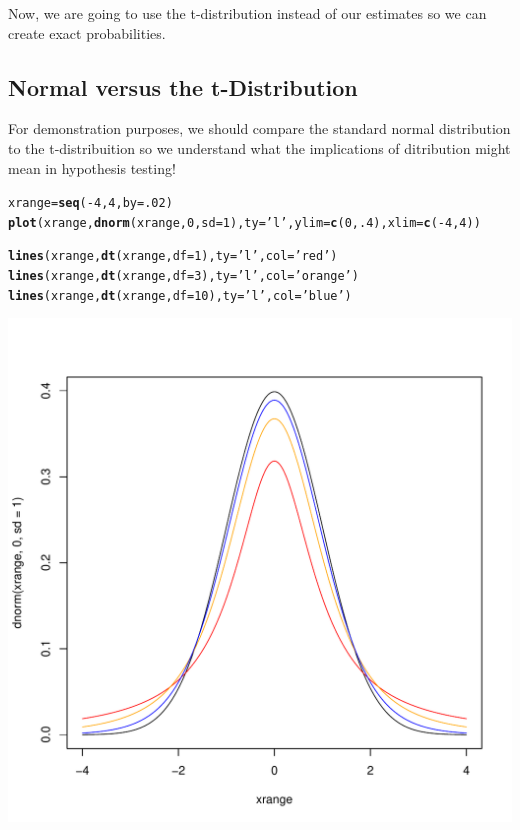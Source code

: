 \documentclass{tufte-handout}\usepackage[]{graphicx}\usepackage[]{color}
\makeatletter
\def\maxwidth{ %
  \ifdim\Gin@nat@width>\linewidth
    \linewidth
  \else
    \Gin@nat@width
  \fi
}
\newcommand{\hlnum}[1]{\textcolor[rgb]{0.686,0.059,0.569}{#1}}%
\newcommand{\hlstr}[1]{\textcolor[rgb]{0.192,0.494,0.8}{#1}}%
\newcommand{\hlopt}[1]{\textcolor[rgb]{0,0,0}{#1}}%
\newcommand{\hlstd}[1]{\textcolor[rgb]{0.345,0.345,0.345}{#1}}%
\newcommand{\hlkwb}[1]{\textcolor[rgb]{0.69,0.353,0.396}{#1}}%
\newcommand{\hlkwc}[1]{\textcolor[rgb]{0.333,0.667,0.333}{#1}}%
\newcommand{\hlkwd}[1]{\textcolor[rgb]{0.737,0.353,0.396}{\textbf{#1}}}%
\newenvironment{kframe}{%
 \def\at@end@of@kframe{}%
 \ifinner\ifhmode%
  \def\at@end@of@kframe{\end{minipage}}%
  \begin{minipage}{\columnwidth}%
 \fi\fi%
 \def\FrameCommand##1{\hskip\@totalleftmargin \hskip-\fboxsep
 \colorbox{shadecolor}{##1}\hskip-\fboxsep
     \hskip-\linewidth \hskip-\@totalleftmargin \hskip\columnwidth}%
 \MakeFramed {\advance\hsize-\width
   \@totalleftmargin\z@ \linewidth\hsize
   \@setminipage}}%
 {\par\unskip\endMakeFramed%
 \at@end@of@kframe}
\newenvironment{knitrout}{}{} %
\makeatother
\begin{document}
Now, we are going to use the t-distribution instead of our estimates so we can create exact probabilities. 

\subsection{Normal versus the t-Distribution}

For demonstration purposes, we should compare the standard normal distribution to the t-distribuition so we understand what the implications of ditribution might mean in hypothesis testing!

\begin{knitrout}
\color{fgcolor}\begin{kframe}
\begin{alltt}
\hlstd{xrange} \hlkwb{=} \hlkwd{seq}\hlstd{(}\hlopt{-}\hlnum{4}\hlstd{,} \hlnum{4}\hlstd{,} \hlkwc{by}\hlstd{=}\hlnum{.02}\hlstd{)}
\hlkwd{plot}\hlstd{(xrange,} \hlkwd{dnorm}\hlstd{(xrange,} \hlnum{0}\hlstd{,} \hlkwc{sd}\hlstd{=}\hlnum{1}\hlstd{),} \hlkwc{ty}\hlstd{=}\hlstr{'l'}\hlstd{,} \hlkwc{ylim}\hlstd{=}\hlkwd{c}\hlstd{(}\hlnum{0}\hlstd{,}\hlnum{.4}\hlstd{),} \hlkwc{xlim}\hlstd{=}\hlkwd{c}\hlstd{(}\hlopt{-}\hlnum{4}\hlstd{,}\hlnum{4}\hlstd{))}

\hlkwd{lines}\hlstd{(xrange,} \hlkwd{dt}\hlstd{(xrange,} \hlkwc{df}\hlstd{=}\hlnum{1}\hlstd{),} \hlkwc{ty}\hlstd{=}\hlstr{'l'}\hlstd{,} \hlkwc{col}\hlstd{=}\hlstr{'red'}\hlstd{)}
\hlkwd{lines}\hlstd{(xrange,} \hlkwd{dt}\hlstd{(xrange,} \hlkwc{df}\hlstd{=}\hlnum{3}\hlstd{),} \hlkwc{ty}\hlstd{=}\hlstr{'l'}\hlstd{,} \hlkwc{col}\hlstd{=}\hlstr{'orange'}\hlstd{)}
\hlkwd{lines}\hlstd{(xrange,} \hlkwd{dt}\hlstd{(xrange,} \hlkwc{df}\hlstd{=}\hlnum{10}\hlstd{),} \hlkwc{ty}\hlstd{=}\hlstr{'l'}\hlstd{,} \hlkwc{col}\hlstd{=}\hlstr{'blue'}\hlstd{)}
\end{alltt}
\end{kframe}
\includegraphics[width=\maxwidth]{figure/unnamed-chunk-14-1} 


\end{knitrout}
\end{document}
